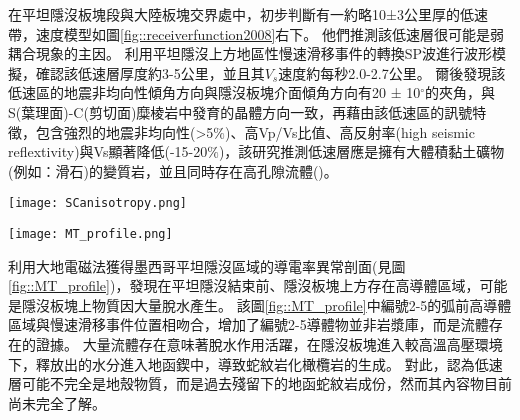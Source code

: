 \citealp{PerezCampos2008}在平坦隱沒板塊段與大陸板塊交界處中，初步判斷有一約略10±3公里厚的低速帶，速度模型如圖\ref{fig::receiverfunction2008}右下。
他們推測該低速層很可能是弱耦合現象的主因。
\citealp{Song2009}利用平坦隱沒上方地區性慢速滑移事件的轉換SP波進行波形模擬，確認該低速層厚度約3-5公里，並且其$V_s$速度約每秒2.0-2.7公里。
爾後\citealp{Song2012SC}發現該低速區的地震非均向性傾角方向與隱沒板塊介面傾角方向有20 ± 10$^{\circ}$的夾角，與S(葉理面)-C(剪切面)糜棱岩中發育的晶體方向一致，再藉由該低速區的訊號特徵，包含強烈的地震非均向性(>5$\%$)、高Vp/Vs比值、高反射率(high seismic reflextivity)與Vs顯著降低(-15-20$\%$)，該研究推測低速層應是擁有大體積黏土礦物(例如：滑石)的變質岩，並且同時存在高孔隙流體(\citealp{Kim2012})。

\begin{figure*}[ht!]
    \centering
    \texttt{[image: SCanisotropy.png]}
    \caption[墨西哥隱沒帶板塊介面附近剪切帶結構示意圖。]{墨西哥隱沒帶板塊介面附近剪切帶結構示意圖，摘自\citealp{Song2012SC}。大地震主要發生在鎖定區(locked zone)和脆性(brittle)變形區域。慢速滑移事件(slow-slip event)主要發生在過渡帶(transition zone)和半韌性區域(seni-ductile regime)，Vs非常低，且非均向性極強。岩石流變轉換由350$^{\circ}$等溫線(淺藍色線)分開，導致應力梯度形成且方向與黏土礦物中流體壓力相反，導致低速帶的形成。這些低速帶流體導致板塊介面處於低耦合狀態，並且主導該地區慢速滑移事件的生成。
    }
    \label{fig::SCanisotorpy2012}
\end{figure*}


\begin{figure*}[ht!]
    \centering
    \texttt{[image: MT\_profile.png]}
    \caption[墨西哥平坦隱沒區域的導電率異常剖面圖與解釋圖。]{墨西哥平坦隱沒區域的導電率異常剖面圖與解釋圖，摘自\citealp{MT2006}。上圖為電阻率異常結果剖面，所繪之隱沒板塊位置參考自\citealp{pardo1995}結果，最上方標示跨墨西哥火山帶的範圍。圖中每個數字圈皆代表隱沒帶上岩石發生向變後脫水的位置。下圖為電阻異常解釋圖，綠色區域為電阻異常低區(<100 $\Omega m$)。在平坦隱沒段結束處有多個岩石相變事件發生，隱沒板塊上出現大範圍導體。
    }
    \label{fig::MT_profile}
\end{figure*}

\citealp{MT2006}利用大地電磁法獲得墨西哥平坦隱沒區域的導電率異常剖面(見圖\ref{fig::MT_profile})，發現在平坦隱沒結束前、隱沒板塊上方存在高導體區域，可能是隱沒板塊上物質因大量脫水產生。
該圖\ref{fig::MT_profile}中編號2-5的弧前高導體區域與慢速滑移事件位置相吻合，增加了編號2-5導體物並非岩漿庫，而是流體存在的證據。
大量流體存在意味著脫水作用活躍，在隱沒板塊進入較高溫高壓環境下，釋放出的水分進入地函鍥中，導致蛇紋岩化橄欖岩的生成。
對此，\citealp{Manea2013}認為低速層可能不完全是地殼物質，而是過去殘留下的地函蛇紋岩成份，然而其內容物目前尚未完全了解。

